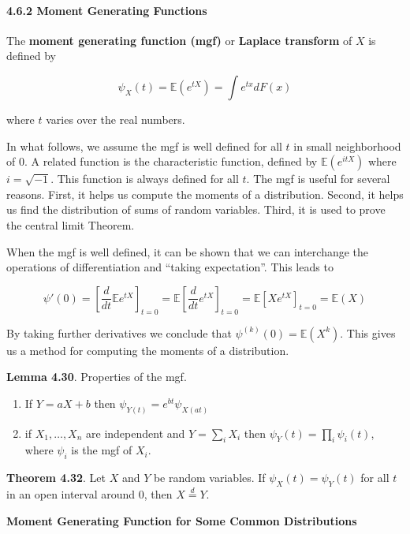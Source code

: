 \paragraph{4.6.2 Moment Generating
Functions}\label{moment-generating-functions}

The \textbf{moment generating function (mgf)} or \textbf{Laplace
transform} of \(X\) is defined by

\[ \psi_X(t) = \mathbb{E}(e^{tX}) = \int e^{tx} dF(x) \]

where \(t\) varies over the real numbers.

In what follows, we assume the mgf is well defined for all \(t\) in
small neighborhood of 0. A related function is the characteristic
function, defined by \(\mathbb{E}(e^{itX})\) where \(i = \sqrt{-1}\).
This function is always defined for all \(t\). The mgf is useful for
several reasons. First, it helps us compute the moments of a
distribution. Second, it helps us find the distribution of sums of
random variables. Third, it is used to prove the central limit Theorem.

When the mgf is well defined, it can be shown that we can interchange
the operations of differentiation and ``taking expectation''. This leads
to

\[ \psi'(0) = \left[ \frac{d}{dt} \mathbb{E} e^{tX} \right]_{t = 0} = \mathbb{E} \left[ \frac{d}{dt} e^{tX} \right]_{t = 0}
= \mathbb{E}[X e^{tX}]_{t = 0} = \mathbb{E}(X)
\]

By taking further derivatives we conclude that
\(\psi^{(k)}(0) = \mathbb{E}(X^{k})\). This gives us a method for
computing the moments of a distribution.

\textbf{Lemma 4.30}. Properties of the mgf.

\begin{enumerate}[tightlist,label={\arabic*.}]
\item
  If \(Y = aX + b\) then \(\psi_{Y(t)} = e^{bt} \psi_{X(at)}\)
\item
  if \(X_{1}, \dots, X_{n}\) are independent and \(Y = \sum_{i} X_{i}\) then
  \(\psi_Y(t) = \prod_{i} \psi_{i}(t)\), where \(\psi_{i}\) is the mgf of
  \(X_{i}\).
\end{enumerate}

\textbf{Theorem 4.32}. Let \(X\) and \(Y\) be random variables. If
\(\psi_X(t) = \psi_Y(t)\) for all \(t\) in an open interval around 0,
then \(X \overset{d}= Y\).

\textbf{Moment Generating Function for Some Common Distributions}

